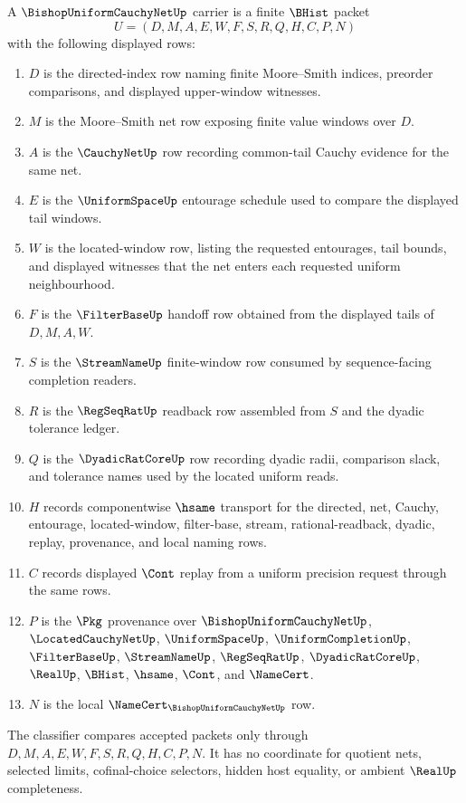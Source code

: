 \begin{definition}
\label{def:bishop-uniform-cauchy-net-carrier}
A $\BishopUniformCauchyNetUp$ carrier is a finite $\BHist$ packet
$$
U=(D,M,A,E,W,F,S,R,Q,H,C,P,N)
$$
with the following displayed rows:
\begin{enumerate}
\item $D$ is the directed-index row naming finite Moore--Smith indices, preorder comparisons, and displayed upper-window witnesses.
\item $M$ is the Moore--Smith net row exposing finite value windows over $D$.
\item $A$ is the $\CauchyNetUp$ row recording common-tail Cauchy evidence for the same net.
\item $E$ is the $\UniformSpaceUp$ entourage schedule used to compare the displayed tail windows.
\item $W$ is the located-window row, listing the requested entourages, tail bounds, and displayed witnesses that the net enters each requested uniform neighbourhood.
\item $F$ is the $\FilterBaseUp$ handoff row obtained from the displayed tails of $D,M,A,W$.
\item $S$ is the $\StreamNameUp$ finite-window row consumed by sequence-facing completion readers.
\item $R$ is the $\RegSeqRatUp$ readback row assembled from $S$ and the dyadic tolerance ledger.
\item $Q$ is the $\DyadicRatCoreUp$ row recording dyadic radii, comparison slack, and tolerance names used by the located uniform reads.
\item $H$ records componentwise $\hsame$ transport for the directed, net, Cauchy, entourage, located-window, filter-base, stream, rational-readback, dyadic, replay, provenance, and local naming rows.
\item $C$ records displayed $\Cont$ replay from a uniform precision request through the same rows.
\item $P$ is the $\Pkg$ provenance over $\BishopUniformCauchyNetUp$, $\LocatedCauchyNetUp$, $\UniformSpaceUp$, $\UniformCompletionUp$, $\FilterBaseUp$, $\StreamNameUp$, $\RegSeqRatUp$, $\DyadicRatCoreUp$, $\RealUp$, $\BHist$, $\hsame$, $\Cont$, and $\NameCert$.
\item $N$ is the local $\NameCert_{\BishopUniformCauchyNetUp}$ row.
\end{enumerate}
The classifier compares accepted packets only through $D,M,A,E,W,F,S,R,Q,H,C,P,N$. It has no coordinate for quotient nets, selected limits, cofinal-choice selectors, hidden host equality, or ambient $\RealUp$ completeness.
\end{definition}

